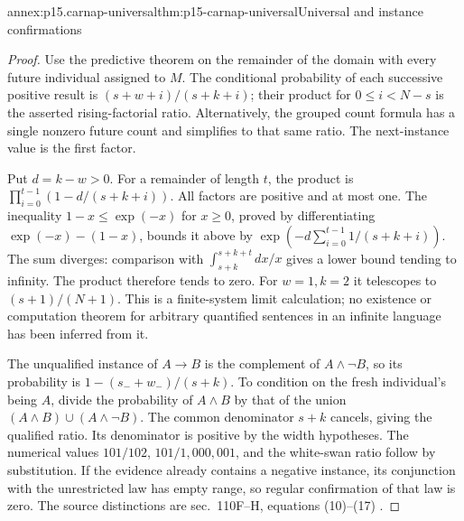 \begin{annexitem}{annex:p15.carnap-universal}{thm:p15-carnap-universal}{Universal and instance confirmations}
\begin{proof}
Use the predictive theorem on the remainder of the domain with every
future individual assigned to \(M\). The conditional probability of
each successive positive result is
\((s+w+i)/(s+k+i)\); their product for \(0\leq i<N-s\)
is the asserted rising-factorial ratio. Alternatively, the grouped
count formula has a single nonzero future count and simplifies to that
same ratio. The next-instance value is the first factor.

Put \(d=k-w>0\). For a remainder of length \(t\), the product
is \(\prod_{i=0}^{t-1}(1-d/(s+k+i))\). All factors are positive
and at most one. The inequality \(1-x\leq\exp(-x)\) for
\(x\geq0\), proved by differentiating
\(\exp(-x)-(1-x)\), bounds it above by
\(\exp(-d\sum_{i=0}^{t-1}1/(s+k+i))\).
The sum diverges: comparison with
\(\int_{s+k}^{s+k+t}dx/x\) gives a lower bound tending to infinity.
The product therefore tends to zero. For \(w=1,k=2\) it telescopes
to \((s+1)/(N+1)\). This is a finite-system limit calculation;
no existence or computation theorem for arbitrary quantified sentences
in an infinite language has been inferred from it.

The unqualified instance of \(A\to B\) is the complement of
\(A\land\neg B\), so its probability is
\(1-(s_-+w_-)/(s+k)\). To condition on the fresh individual's
being \(A\), divide the probability of \(A\land B\) by that
of the union \((A\land B)\cup(A\land\neg B)\). The common
denominator \(s+k\) cancels, giving the qualified ratio. Its
denominator is positive by the width hypotheses.
The numerical values \(101/102\), \(101/1{,}000{,}001\), and
the white-swan ratio follow by substitution. If the evidence already
contains a negative instance, its conjunction with the unrestricted law
has empty range, so regular confirmation of that law is zero. The source
distinctions are sec.~110F--H, equations (10)--(17)
\cite{Carnap1950Probability}.
\end{proof}
\end{annexitem}

